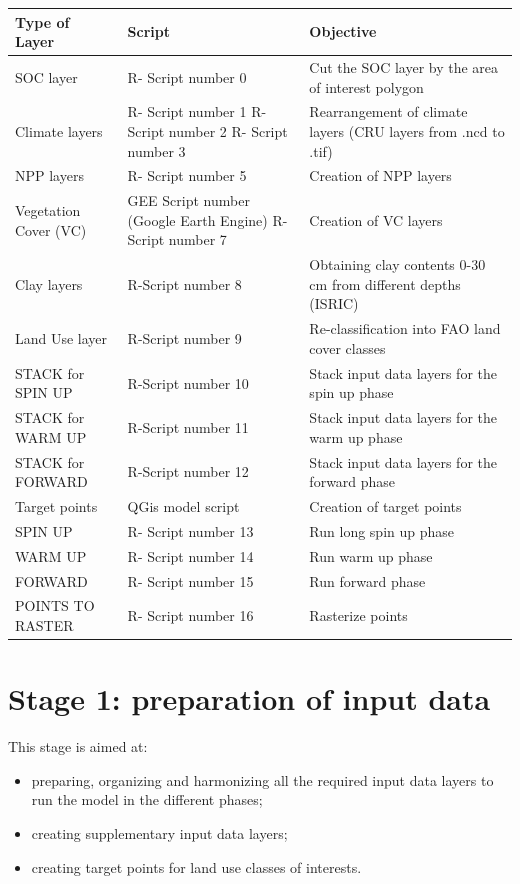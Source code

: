 \documentclass[
  10pt,
  b5paper,
]{book}
\providecommand{\tightlist}{%
  \setlength{\itemsep}{0pt}\setlength{\parskip}{0pt}}
\begin{document}
\begin{table}
\centering
\begin{tabular}{l|l|l}
\hline
Type of Layer & Script & Objective\\
\hline
SOC layer & R- Script number 0 & Cut the SOC layer by the area of interest polygon\\
\hline
Climate layers & R- Script number 1
 R- Script number 2
 R- Script number 3 & Rearrangement of climate layers (CRU layers from .ncd to .tif)\\
\hline
NPP layers & R- Script number 5 & Creation of NPP layers\\
\hline
Vegetation Cover (VC) & GEE Script number (Google Earth Engine) 
R- Script number 7 & Creation of VC  layers\\
\hline
Clay layers & R-Script number 8 & Obtaining clay contents 0-30 cm from different depths (ISRIC)\\
\hline
Land Use layer & R-Script number 9 & Re-classification into FAO land cover classes\\
\hline
STACK for SPIN UP & R-Script number 10 & Stack input data layers  for the spin up phase\\
\hline
STACK for WARM UP & R-Script number 11 & Stack input data layers  for the warm up phase\\
\hline
STACK for FORWARD & R-Script number 12 & Stack input data layers  for the forward phase\\
\hline
Target points & QGis model script & Creation of target points\\
\hline
SPIN UP & R- Script number 13 & Run long spin up phase\\
\hline
WARM UP & R- Script number 14 & Run warm up phase\\
\hline
FORWARD & R- Script number 15 & Run forward phase\\
\hline
POINTS TO RASTER & R- Script number 16 & Rasterize points\\
\hline
\end{tabular}
\end{table}

\hypertarget{stage-1-preparation-of-input-data}{%
\chapter{\textbar{} Stage 1: preparation of input data}\label{stage-1-preparation-of-input-data}}

This stage is aimed at:

\begin{itemize}
\tightlist
\item
  preparing, organizing and harmonizing all the required input data layers to run the model in the different phases;
\item
  creating supplementary input data layers;
\item
  creating target points for land use classes of interests.
\end{itemize}
\end{document}
